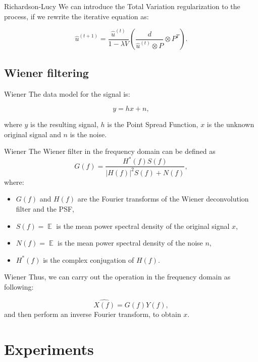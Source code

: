 \documentclass[aspectratio=1610]{beamer}
\begin{document}
\begin{frame}{Richardson-Lucy}
  We can introduce the Total Variation regularization to the process, if
  we rewrite the iterative equation as:
  
  $$
  \hat{u}^{(t+1)}=\frac{\hat{u}^{(t)}}{1 - \lambda V}
  (\frac{d}{\hat{u}^{(t)} \otimes P} \otimes P^T).
  $$
\end{frame}

\subsection {Wiener filtering}
\begin{frame}{Wiener}
  The data model for the signal is:
  
  $$
  y = hx + n,
  $$
  
  where $y$ is the resulting signal, $h$ is the Point Spread Function,
  $x$ is the unknown original signal and $n$ is the noise.
\end{frame}

\begin{frame}{Wiener}
  The Wiener filter in the frequency domain can be defined as
  $$
  G(f) = \frac{H^*(f)S(f)}{|H(f)|^2S(f)+N(f)},
  $$
  where:
  \begin{itemize}
    \item $G(f)$ and $H(f)$ are the Fourier transforms of 
      the Wiener deconvolution filter and the PSF,
    \item $S(f) = \mathop{\mathbb{E}|X(f)|^2}$ is the mean power spectral 
      density of the original signal $x$,
    \item $N(f) = \mathop{\mathbb{E}|X(f)|^2}$ is the mean power spectral 
      density of the noise $n$,
    \item $H^*(f)$ is the complex conjugation of $H(f)$.
  \end{itemize}
\end{frame}

\begin{frame}{Wiener}
  Thus, we can carry out the operation in the frequency domain as following:
  
  $$
  \hat{X(f)} = G(f)Y(f),
  $$
  and then perform an inverse Fourier transform, to obtain $x$.
\end{frame}

\section {Experiments}
\end{document}

